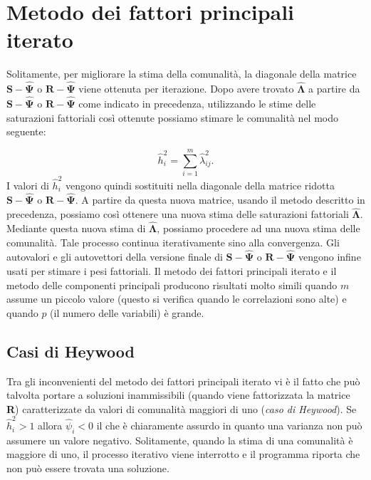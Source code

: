 \section{Metodo dei fattori principali iterato}

Solitamente, per migliorare la stima della comunalità, la
 diagonale della matrice $\textbf{S} - \hat{\boldsymbol{\Psi}}$ o
 $\textbf{R} - \hat{\boldsymbol{\Psi}}$  viene  ottenuta per
 iterazione. 
 Dopo avere trovato $\hat{\boldsymbol{\Lambda}}$ a partire da  $\textbf{S} - \hat{\boldsymbol{\Psi}}$ o $\textbf{R} - \hat{\boldsymbol{\Psi}}$ come indicato in precedenza, utilizzando le stime delle saturazioni fattoriali  così ottenute possiamo stimare le comunalità nel modo seguente:
 
\begin{equation}
\hat{h}^2_i = \sum_{i=1}^m \hat{\lambda}_{ij}^2.
\end{equation}
I valori di $\hat{h}^2_i$ vengono quindi sostituiti nella
    diagonale della matrice ridotta $\textbf{S} - \hat{\boldsymbol{\Psi}}$ o $\textbf{R} - \hat{\boldsymbol{\Psi}}$.  A partire da questa nuova matrice, usando il metodo descritto in precedenza, possiamo così ottenere una nuova stima delle saturazioni fattoriali $\hat{\boldsymbol{\Lambda}}$.
 Mediante questa nuova stima di $\hat{\boldsymbol{\Lambda}}$, possiamo procedere ad una nuova stima delle comunalità.  Tale processo continua iterativamente sino alla convergenza. 
 Gli autovalori e gli autovettori della versione finale di $\textbf{S} - \hat{\boldsymbol{\Psi}}$ o $\textbf{R} - \hat{\boldsymbol{\Psi}}$ vengono infine usati per  stimare i pesi fattoriali.
Il metodo dei fattori principali iterato e  il metodo delle componenti principali producono risultati molto simili quando
$m$ assume un piccolo valore (questo si verifica quando le correlazioni sono alte) e quando   $p$ (il numero delle variabili) è grande.

\subsection{Casi di Heywood}

Tra gli inconvenienti del metodo dei fattori principali iterato vi è il fatto che può talvolta 
portare a soluzioni inammissibili (quando viene fattorizzata la
matrice \textbf{R}) caratterizzate da valori di comunalità maggiori di
uno  (\emph{caso di Heywood}).
 Se $\hat{h}^2_i > 1$ allora $\hat{\psi}_i < 0$ il che è
  chiaramente assurdo in quanto una varianza non può assumere un
  valore negativo.  
 Solitamente, quando la stima di una comunalità è maggiore di uno, il processo iterativo viene interrotto e il programma riporta che  non può essere trovata una soluzione. 

